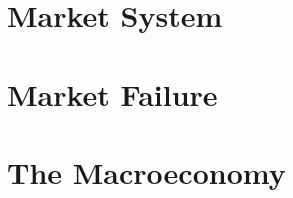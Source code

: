 \documentclass{slnotes}
\begin{document}
\part{Market System}



\part{Market Failure}


\part{The Macroeconomy}





\end{document}
